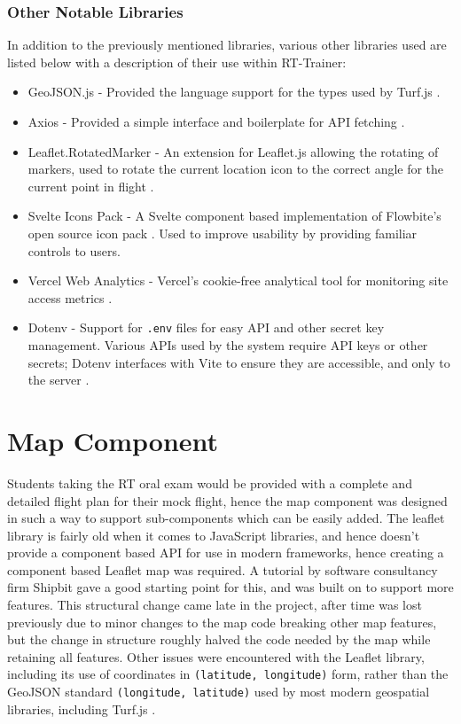 \subsubsection{Other Notable Libraries}
\label{se:otherlibraries}
In addition to the previously mentioned libraries, various other libraries used are listed below with a description of their use within RT-Trainer:
\begin{itemize}
    \item GeoJSON.js - Provided the language support for the types used by Turf.js \cite{GeoJSONNPM}.
    \item Axios - Provided a simple interface and boilerplate for API fetching \cite{AxiosNPM}.
    \item Leaflet.RotatedMarker - An extension for Leaflet.js allowing the rotating of markers, used to rotate the current location icon to the correct angle for the current point in flight \cite{LeafletRotatedMarkerNPM}.
    \item Svelte Icons Pack - A Svelte component based implementation of Flowbite's open source icon pack \cite{FlowbiteIcons}\cite{FlowbiteSvelteIconsNPM}. Used to improve usability by providing familiar controls to users.
    \item Vercel Web Analytics - Vercel's cookie-free analytical tool for monitoring site access metrics \cite{VercelWebAnalyticsNPM}.
    \item Dotenv - Support for \texttt{.env} files for easy API and other secret key management. Various APIs used by the system require API keys or other secrets; Dotenv interfaces with Vite to ensure they are accessible, and only to the server \cite{DotenvNPM}.
\end{itemize}

\section{Map Component}
\label{se:map}

Students taking the RT oral exam would be provided with a complete and detailed flight plan for their mock flight, hence the map component was designed in such a way to support sub-components which can be easily added. The leaflet library is fairly old when it comes to JavaScript libraries, and hence doesn't provide a component based API for use in modern frameworks, hence creating a component based Leaflet map was required. A tutorial by software consultancy firm Shipbit gave a good starting point for this, and was built on to support more features. This structural change came late in the project, after time was lost previously due to minor changes to the map code breaking other map features, but the change in structure roughly halved the code needed by the map while retaining all features. Other issues were encountered with the Leaflet library, including its use of coordinates in \texttt{(latitude, longitude)} form, rather than the GeoJSON standard \texttt{(longitude, latitude)} used by most modern geospatial libraries, including Turf.js \cite{GeoJSONRFC}.

